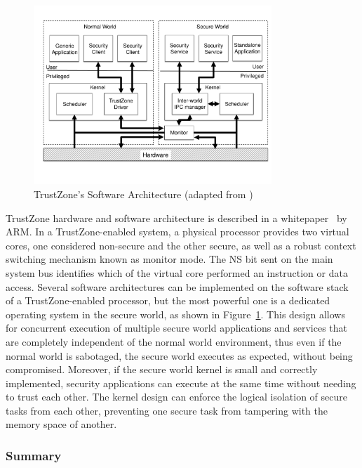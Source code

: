 \begin{figure}[t!]
	\centering
	\includegraphics[width=0.80\textwidth]{img/trustzone.pdf}
	\caption{TrustZone's Software Architecture (adapted from \cite{trustzone_whitepaper})}
	\label{fig:trustzone_architecture}
\end{figure}

TrustZone hardware and software architecture is described in a whitepaper~\cite{trustzone_whitepaper} by ARM. In a TrustZone-enabled system, a physical processor provides two virtual cores, one considered non-secure and the other secure, as well as a robust context switching mechanism known as monitor mode. The NS bit sent on the main system bus identifies which of the virtual core performed an instruction or data access. Several software architectures can be implemented on the software stack of a TrustZone-enabled processor, but the most powerful one is a dedicated operating system in the secure world, as shown in Figure~\ref{fig:trustzone_architecture}. This design allows for concurrent execution of multiple secure world applications and services that are completely independent of the normal world environment, thus even if the normal world is sabotaged, the secure world executes as expected, without being compromised. Moreover, if the secure world kernel is small and correctly implemented, security applications can execute at the same time without needing to trust each other. The kernel design can enforce the logical isolation of secure tasks from each other, preventing one secure task from tampering with the memory space of another.

\subsubsection{Summary}

